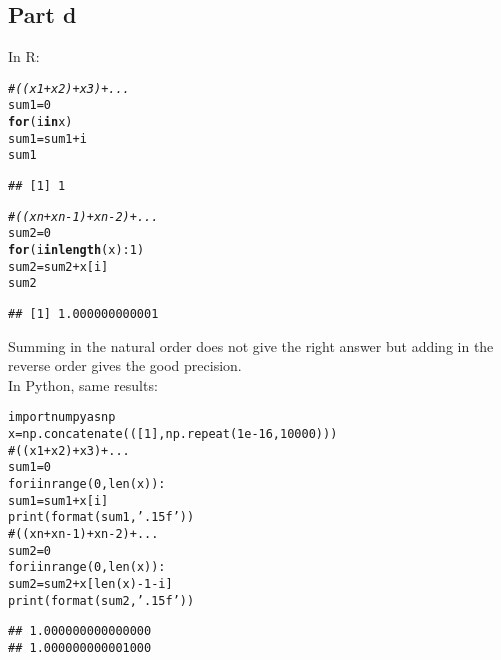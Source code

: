 \documentclass{llncs}\usepackage[]{graphicx}\usepackage[]{color}
\makeatletter
\newcommand{\hlnum}[1]{\textcolor[rgb]{0.686,0.059,0.569}{#1}}%
\newcommand{\hlcom}[1]{\textcolor[rgb]{0.678,0.584,0.686}{\textit{#1}}}%
\newcommand{\hlopt}[1]{\textcolor[rgb]{0,0,0}{#1}}%
\newcommand{\hlstd}[1]{\textcolor[rgb]{0.345,0.345,0.345}{#1}}%
\newcommand{\hlkwa}[1]{\textcolor[rgb]{0.161,0.373,0.58}{\textbf{#1}}}%
\newcommand{\hlkwb}[1]{\textcolor[rgb]{0.69,0.353,0.396}{#1}}%
\newcommand{\hlkwd}[1]{\textcolor[rgb]{0.737,0.353,0.396}{\textbf{#1}}}%
\newenvironment{kframe}{%
 \def\at@end@of@kframe{}%
 \ifinner\ifhmode%
  \def\at@end@of@kframe{\end{minipage}}%
  \begin{minipage}{\columnwidth}%
 \fi\fi%
 \def\FrameCommand##1{\hskip\@totalleftmargin \hskip-\fboxsep
 \colorbox{shadecolor}{##1}\hskip-\fboxsep
     \hskip-\linewidth \hskip-\@totalleftmargin \hskip\columnwidth}%
 \MakeFramed {\advance\hsize-\width
   \@totalleftmargin\z@ \linewidth\hsize
   \@setminipage}}%
 {\par\unskip\endMakeFramed%
 \at@end@of@kframe}
\newenvironment{knitrout}{}{} %
\makeatother
\begin{document}
\subsection{Part d}
In R:
\begin{knitrout}
\color{fgcolor}\begin{kframe}
\begin{alltt}
\hlcom{# ((x1 + x2) + x3) + ...}
\hlstd{sum1}\hlkwb{=}\hlnum{0}
\hlkwa{for} \hlstd{(i} \hlkwa{in} \hlstd{x)}
  \hlstd{sum1}\hlkwb{=}\hlstd{sum1}\hlopt{+}\hlstd{i}
\hlstd{sum1}
\end{alltt}
\begin{lstlisting}[basicstyle=\ttfamily,breaklines=true]
## [1] 1
\end{lstlisting}
\begin{alltt}
\hlcom{# ((xn + xn-1) + xn-2) + ...}
\hlstd{sum2}\hlkwb{=}\hlnum{0}
\hlkwa{for} \hlstd{(i} \hlkwa{in} \hlkwd{length}\hlstd{(x)}\hlopt{:}\hlnum{1}\hlstd{)}
  \hlstd{sum2}\hlkwb{=}\hlstd{sum2}\hlopt{+}\hlstd{x[i]}
\hlstd{sum2}
\end{alltt}
\begin{lstlisting}[basicstyle=\ttfamily,breaklines=true]
## [1] 1.000000000001
\end{lstlisting}
\end{kframe}
\end{knitrout}
Summing in the natural order does not give the right answer but adding in the reverse order gives the good precision.\\
In Python, same results:
\begin{knitrout}
\color{fgcolor}\begin{kframe}
\begin{alltt}
import numpy as np
x=np.concatenate(([1],np.repeat(1e-16,10000)))
#((x1 + x2) + x3) + ...
sum1=0
for i in range(0,len(x)):
  sum1=sum1+x[i]
print(format(sum1, '.15f'))
#((xn + xn-1) + xn-2) + ...
sum2=0
for i in range(0,len(x)):
  sum2=sum2+x[len(x)-1-i]
print(format(sum2, '.15f'))
\end{alltt}

\begin{lstlisting}[basicstyle=\ttfamily,breaklines=true]
## 1.000000000000000
## 1.000000000001000
\end{lstlisting}
\end{kframe}
\end{knitrout}
\end{document}
